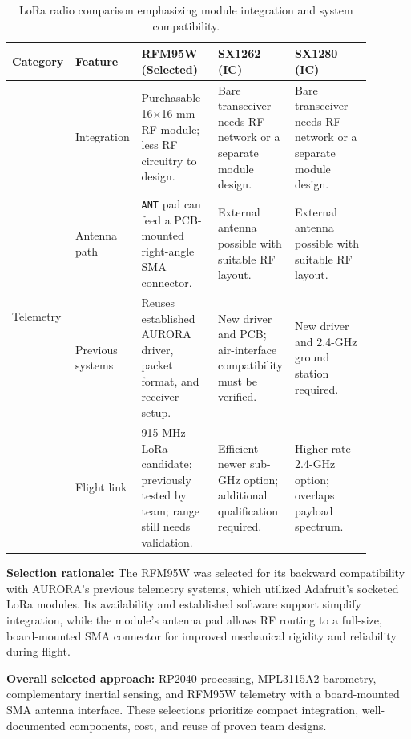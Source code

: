 \documentclass[11pt]{IEEEtran}
\begin{document}
\begin{table}[H]
\centering\small
\begin{tabular}{@{}p{0.11\linewidth}p{0.14\linewidth}p{0.215\linewidth}p{0.215\linewidth}p{0.215\linewidth}@{}}
\toprule
\textbf{Category} & \textbf{Feature} & \textbf{RFM95W (Selected)} & \textbf{SX1262 (IC)} & \textbf{SX1280 (IC)} \\
\midrule
\multirow{4}{*}{Telemetry}
 & Integration & Purchasable 16$\times$16-mm RF module; less RF circuitry to design. & Bare transceiver needs RF network or a separate module design. & Bare transceiver needs RF network or a separate module design. \\ \cmidrule{2-5}
 & Antenna path & \texttt{ANT} pad can feed a PCB-mounted right-angle SMA connector. & External antenna possible with suitable RF layout. & External antenna possible with suitable RF layout. \\ \cmidrule{2-5}
 & Previous systems & Reuses established AURORA driver, packet format, and receiver setup. & New driver and PCB; air-interface compatibility must be verified. & New driver and 2.4-GHz ground station required. \\ \cmidrule{2-5}
 & Flight link & 915-MHz LoRa candidate; previously tested by team; range still needs validation. & Efficient newer sub-GHz option; additional qualification required. & Higher-rate 2.4-GHz option; overlaps payload spectrum. \\
\bottomrule
\end{tabular}
\vspace{3mm}
\caption{LoRa radio comparison emphasizing module integration and system compatibility.}
\label{tab:Radio_Comparison}
\end{table}

\noindent\textbf{Selection rationale:} The RFM95W was selected for its backward compatibility with AURORA's previous telemetry systems, which utilized Adafruit's socketed LoRa modules. Its availability and established software support simplify integration, while the module's antenna pad allows RF routing to a full-size, board-mounted SMA connector for improved mechanical rigidity and reliability during flight.

\noindent\textbf{Overall selected approach:} RP2040 processing, MPL3115A2 barometry, complementary inertial sensing, and RFM95W telemetry with a board-mounted SMA antenna interface. These selections prioritize compact integration, well-documented components, cost, and reuse of proven team designs.
\end{document}
